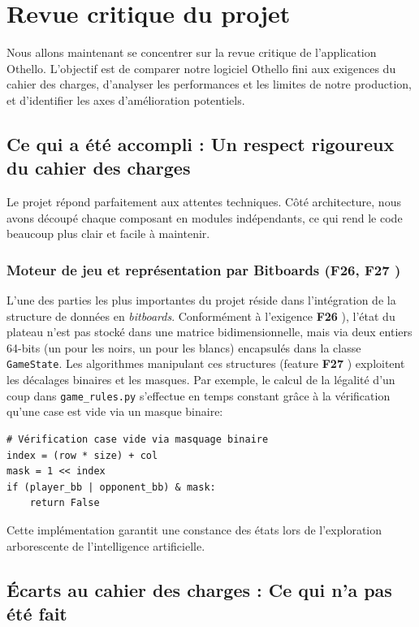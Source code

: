 \documentclass[a4paper]{article}
\begin{document}
\section{Revue critique du projet}

Nous allons maintenant se concentrer sur la revue critique de l'application Othello. L'objectif est de comparer notre logiciel Othello fini aux exigences du cahier des charges, d'analyser les performances et les limites de notre production, et d'identifier les axes d'amélioration potentiels.

\subsection{Ce qui a été accompli : Un respect rigoureux du cahier des charges}

Le projet répond parfaitement aux attentes techniques. Côté architecture, nous avons découpé chaque composant en modules indépendants, ce qui rend le code beaucoup plus clair et facile à maintenir.

\subsubsection{Moteur de jeu et représentation par Bitboards (F26, F27 \cite{OthelloSpecs2025})}
L'une des parties les plus importantes du projet réside dans l'intégration de la structure de données en \textit{bitboards}. Conformément à l'exigence \textbf{F26} \cite{OthelloSpecs2025}), l'état du plateau n'est pas stocké dans une matrice bidimensionnelle, mais via deux entiers 64-bits (un pour les noirs, un pour les blancs) encapsulés dans la classe \texttt{GameState}.
Les algorithmes manipulant ces structures (feature \textbf{F27} \cite{OthelloSpecs2025}) exploitent les décalages binaires et les masques. Par exemple, le calcul de la légalité d'un coup dans \texttt{game\_rules.py} s'effectue en temps constant grâce à la vérification qu'une case est vide via un masque binaire:
\begin{verbatim}
# Vérification case vide via masquage binaire
index = (row * size) + col
mask = 1 << index
if (player_bb | opponent_bb) & mask:
    return False
\end{verbatim}
Cette implémentation garantit une constance des états lors de l'exploration arborescente de l'intelligence artificielle.

\subsection{Écarts au cahier des charges : Ce qui n'a pas été fait}
\end{document}
